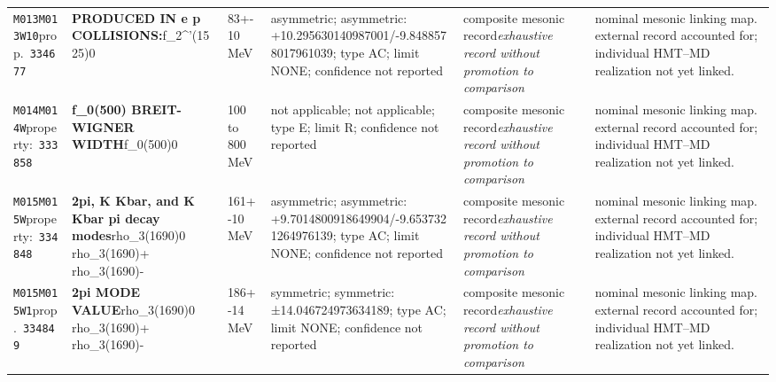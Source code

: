 \begin{landscape}
\begin{longtable}{L{1.85cm}L{4.45cm}L{2.35cm}L{4.05cm}L{3.35cm}L{7.15cm}}
\texttt{M013}\newline \texttt{M013W10}\newline prop.\ \texttt{334677} & \textbf{PRODUCED IN e p COLLISIONS:}\newline f\_\allowbreak{}2\textasciicircum{}'(1525)0 & 83+-10\,MeV & asymmetric; asymmetric: +10.295630140987001/-9.8488578017961039; type AC; limit NONE; confidence not reported & composite mesonic record\newline \emph{exhaustive record without promotion to comparison} & nominal mesonic linking map. external record accounted for; individual HMT--MD realization not yet linked. \\
\texttt{M014}\newline \texttt{M014W}\newline property:\ \texttt{333858} & \textbf{f\_\allowbreak{}0(500) BREIT-WIGNER WIDTH}\newline f\_\allowbreak{}0(500)0 & 100 to 800\,MeV & not applicable; not applicable; type E; limit R; confidence not reported & composite mesonic record\newline \emph{exhaustive record without promotion to comparison} & nominal mesonic linking map. external record accounted for; individual HMT--MD realization not yet linked. \\
\texttt{M015}\newline \texttt{M015W}\newline property:\ \texttt{334848} & \textbf{2pi, K Kbar, and K Kbar pi decay modes}\newline rho\_\allowbreak{}3(1690)0 \textbar{}\allowbreak{} rho\_\allowbreak{}3(1690)+ \textbar{}\allowbreak{} rho\_\allowbreak{}3(1690)- & 161+-10\,MeV & asymmetric; asymmetric: +9.7014800918649904/-9.6537321264976139; type AC; limit NONE; confidence not reported & composite mesonic record\newline \emph{exhaustive record without promotion to comparison} & nominal mesonic linking map. external record accounted for; individual HMT--MD realization not yet linked. \\
\texttt{M015}\newline \texttt{M015W1}\newline prop.\ \texttt{334849} & \textbf{2pi MODE VALUE}\newline rho\_\allowbreak{}3(1690)0 \textbar{}\allowbreak{} rho\_\allowbreak{}3(1690)+ \textbar{}\allowbreak{} rho\_\allowbreak{}3(1690)- & 186+-14\,MeV & symmetric; symmetric: ±14.046724973634189; type AC; limit NONE; confidence not reported & composite mesonic record\newline \emph{exhaustive record without promotion to comparison} & nominal mesonic linking map. external record accounted for; individual HMT--MD realization not yet linked. \\

\end{longtable}
\end{landscape}
